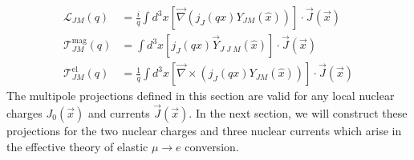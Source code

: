 \documentclass{book}[12pt]
\begin{document}
\begin{equation}
\begin{split}
\mathcal{L}_{JM}(q)&=\frac{i}{q}\int d^3x \left[\vec{\nabla}\left(j_J(qx)Y_{JM}(\hat{x})\right)\right]\cdot\vec{J}(\vec{x})\\
\mathcal{T}^{\mathrm{mag}}_{JM}(q)&=\int d^3x\left[j_J(qx)\vec{Y}_{J\;J\;M}(\hat{x})\right]\cdot\vec{J}(\vec{x})\\
\mathcal{T}^{\mathrm{el}}_{JM}(q)&=\frac{1}{q}\int d^3x\left[\vec{\nabla}\times\left(j_J(qx)Y_{JM}(\hat{x})\right)\right]\cdot\vec{J}(\vec{x})
\end{split}
\end{equation}
The multipole projections defined in this section are valid for any local nuclear charges $J_0(\vec{x})$ and currents $\vec{J}(\vec{x})$. In the next section, we will construct these projections for the two nuclear charges and three nuclear currents which arise in the effective theory of elastic $\mu\rightarrow e$ conversion.

\end{document}
